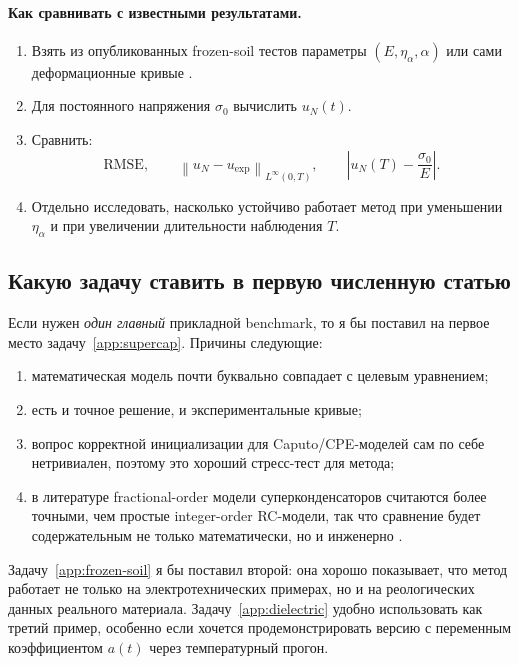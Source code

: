 \documentclass[12pt,a4paper]{article}
\theoremstyle{definition}
\newcommand{\norm}[1]{\left\lVert #1 \right\rVert}
\begin{document}
\paragraph{Как сравнивать с известными результатами.}
\begin{enumerate}[label=\textup{(\alph*)}]
\item Взять из опубликованных frozen-soil тестов параметры $(E,\eta_\alpha,\alpha)$
или сами деформационные кривые \cite{zhang2022frozen}.
\item Для постоянного напряжения $\sigma_0$ вычислить $u_N(t)$.
\item Сравнить:
\[
\mathrm{RMSE},
\qquad
\norm{u_N-u_{\mathrm{exp}}}_{L^\infty(0,T)},
\qquad
\left|u_N(T)-\frac{\sigma_0}{E}\right|.
\]
\item Отдельно исследовать, насколько устойчиво работает метод при уменьшении
$\eta_\alpha$ и при увеличении длительности наблюдения $T$.
\end{enumerate}

\subsection{Какую задачу ставить в первую численную статью}

Если нужен \emph{один главный} прикладной benchmark, то я бы поставил на первое место
задачу~\ref{app:supercap}. Причины следующие:
\begin{enumerate}[label=\textup{(\roman*)}]
\item математическая модель почти буквально совпадает с целевым уравнением;
\item есть и точное решение, и экспериментальные кривые;
\item вопрос корректной инициализации для Caputo/CPE-моделей сам по себе нетривиален,
поэтому это хороший стресс-тест для метода;
\item в литературе fractional-order модели суперконденсаторов считаются более точными,
чем простые integer-order RC-модели, так что сравнение будет содержательным
не только математически, но и инженерно \cite{lopez2022cpe,wang2020ultracap}.
\end{enumerate}

Задачу~\ref{app:frozen-soil} я бы поставил второй: она хорошо показывает,
что метод работает не только на электротехнических примерах, но и на реологических
данных реального материала.
Задачу~\ref{app:dielectric} удобно использовать как третий пример,
особенно если хочется продемонстрировать версию с переменным коэффициентом $a(t)$
через температурный прогон.


\end{document}
